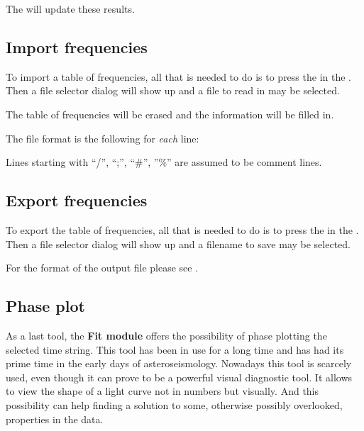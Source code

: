 The  will update these results.

\subsection{Import frequencies}%
\label{period.import}
To import a table of frequencies, all that is needed to do is
to press the  in the %
. Then a file selector dialog will show up and a file to 
read in may be selected.

The table of frequencies will be erased and the information will be filled
in.

The file format is the following for {\it each} line:

Lines starting with ``/'', ``;'', ``\#'', ''\%''
are assumed to be comment lines.

\subsection{Export frequencies}%
\label{period.export}
To export the table of frequencies, all that is needed to do is
to press the  in the .
Then a file selector dialog will show up and a filename to save
may be selected.

For the format of the output file please see
.

\subsection{Phase plot}%
\label{period.phase}
As a last tool, the {\bf Fit module} offers the possibility of phase plotting
the selected time string. This tool has been in use for a long time 
and has had its prime time in the early days of asteroseismology. 
Nowadays this tool is scarcely used, even though
it can prove to be a powerful visual diagnostic tool.
It allows to view the shape of a light curve not in numbers 
but visually. And this possibility can help finding a solution to some,
otherwise possibly overlooked, properties in the data.

